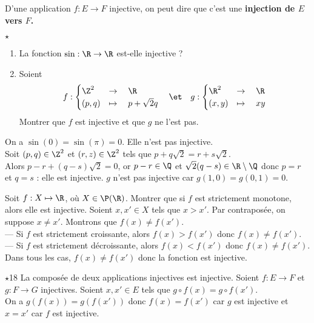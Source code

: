 \documentclass[11pt]{article}
\begin{document}
D'une application $f:E\to F$ injective, on peut dire que c'est une \bf{injection} de $E$ vers $F$.

\begin{ex}{$\star$}{}
    \begin{enumerate}
        \item La fonction $\sin:\R\to\R$ est-elle injective ?
        \item Soient
        \begin{equation*}
            f : \begin{cases}
                \Z^2 & \to \quad \R\\
                (p,q) &\mapsto \quad p + \sqrt{2}q
            \end{cases} \quad \et \quad g : \begin{cases}
                \R^2 &\to \quad \R\\
                (x,y) &\mapsto \quad xy
            \end{cases}
        \end{equation*}
        Montrer que $f$ est injective et que $g$ ne l'est pas.
    \end{enumerate}
    \tcblower
     On a $\sin(0)=\sin(\pi)=0$. Elle n'est pas injective.\\
     Soit $(p,q)\in\Z^2$ et $(r,z)\in\Z^2$ tels que $p+q\sqrt{2}=r+s\sqrt{2}$.\\
    Alors $p-r+(q-s)\sqrt{2}=0$, or $p-r\in\Q$ et $\sqrt{2}(q-s)\in\R\setminus\Q$ donc $p=r$ et $q=s$ : elle est injective.\n
    $g$ n'est pas injective car $g(1,0)=g(0,1)=0$.
\end{ex}

\begin{ex}{}{}
    Soit $f:X\mapsto\R$, où $X\in\P(\R)$. Montrer que si $f$ est strictement monotone, alors elle est injective.
    \tcblower
    Soient $x,x'\in X$ tels que $x>x'$. Par contraposée, on suppose $x\neq x'$. Montrons que $f(x)\neq f(x')$.\\
    --- Si $f$ est strictement croissante, alors $f(x)>f(x')$ donc $f(x)\neq f(x')$.\\
    --- Si $f$ est strictement décroissante, alors $f(x)<f(x')$ donc $f(x)\neq f(x')$.\\
    Dans tous les cas, $f(x)\neq f(x')$ donc la fonction est injective.
\end{ex}

\begin{prop}{$\star$}{18}
    La composée de deux applications injectives est injective.
    \tcblower
    Soient $f:E\to F$ et $g:F\to G$ injectives. Soient $x,x'\in E$ tels que $g\circ f(x)= g\circ f(x')$.\\
    On a $g(f(x))=g(f(x'))$ donc $f(x)=f(x')$ car $g$ est injective et $x=x'$ car $f$ est injective.
\end{prop}
\end{document}
